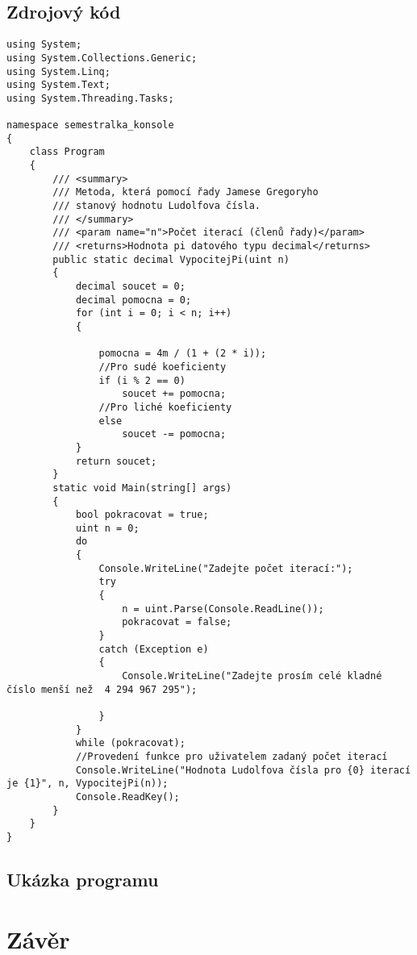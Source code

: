 \documentclass[11pt,a4paper,twoside,openright]{report}
\begin{document}
	\section{Zdrojový kód}
\begin{verbatim}
using System;
using System.Collections.Generic;
using System.Linq;
using System.Text;
using System.Threading.Tasks;

namespace semestralka_konsole
{
    class Program
    {
        /// <summary>
        /// Metoda, která pomocí řady Jamese Gregoryho
        /// stanový hodnotu Ludolfova čísla.
        /// </summary>
        /// <param name="n">Počet iterací (členů řady)</param>
        /// <returns>Hodnota pi datového typu decimal</returns>
        public static decimal VypocitejPi(uint n)
        {
            decimal soucet = 0;
            decimal pomocna = 0;
            for (int i = 0; i < n; i++)
            {

                pomocna = 4m / (1 + (2 * i));
                //Pro sudé koeficienty
                if (i % 2 == 0)
                    soucet += pomocna;
                //Pro liché koeficienty
                else
                    soucet -= pomocna;
            }
            return soucet;
        }
        static void Main(string[] args)
        {
            bool pokracovat = true;
            uint n = 0;
            do
            {
                Console.WriteLine("Zadejte počet iterací:");
                try
                {
                    n = uint.Parse(Console.ReadLine());
                    pokracovat = false;
                }
                catch (Exception e)
                {
                    Console.WriteLine("Zadejte prosím celé kladné číslo menší než  4 294 967 295");

                }
            }
            while (pokracovat);
            //Provedení funkce pro uživatelem zadaný počet iterací
            Console.WriteLine("Hodnota Ludolfova čísla pro {0} iterací je {1}", n, VypocitejPi(n));
            Console.ReadKey();
        }
    }
}
\end{verbatim}
	\section{Ukázka programu}
	\chapter*{Závěr}
	\pagestyle{empty}
	
\end{document}
